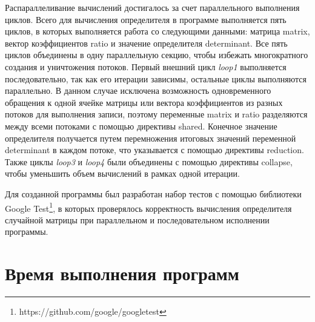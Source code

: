 \documentclass[a4paper,14pt]{extarticle}
\begin{document}
    Распараллеливание вычислений достигалось за счет параллельного выполнения циклов.
    Всего для вычисления определителя в программе выполняется пять циклов,
    в которых выполняется работа со следующими данными: матрица matrix,
    вектор коэффициентов ratio и значение определителя determinant.
    Все пять циклов объединены в одну параллельную секцию, чтобы избежать многократного создания и уничтожения потоков.
    Первый внешний цикл \textit{loop1} выполняется последовательно, так как его итерации зависимы,
    остальные циклы выполняются параллельно.
    В данном случае исключена возможность одновременного обращения к одной ячейке матрицы или вектора коэффициентов из
    разных потоков для выполнения записи, поэтому переменные matrix и ratio разделяются между всеми потоками с помощью
    директивы shared.
    Конечное значение определителя получается путем перемножения итоговых значений переменной determinant в каждом потоке,
    что указывается с помощью директивы reduction.
    Также циклы \textit{loop3} и \textit{loop4} были объединены с помощью директивы collapse,
    чтобы уменьшить объем вычислений в рамках одной итерации.

    Для созданной программы был разработан набор тестов с помощью библиотеки
    Google Test\footnote{https://github.com/google/googletest}, в которых проверялось
    корректность вычисления определителя случайной матрицы при параллельном и последовательном исполнении программы.

    \section{Время выполнения программ}
\end{document}
